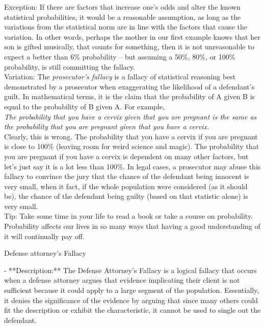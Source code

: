 \documentclass[a4paper,12pt,single,pdftex]{scrbook}
\begin{document}
{    
      Exception: If there are factors that increase one’s odds and alter the known statistical probabilities, it would be a reasonable assumption, as long as the variations from the statistical norm are in line with the factors that cause the variation.  In other words, perhaps the mother in our first example knows that her son is gifted musically, that counts for something, then it is not unreasonable to expect a better than 6\% probability -- but assuming a 50\%, 80\%, or 100\% probability, is still committing the fallacy.
    \\

    
      Variation: The {\em prosecutor's fallacy} is a fallacy of statistical reasoning best demonstrated by a prosecutor when exaggerating the likelihood of a defendant's guilt. In mathematical terms, it is the claim that the probability of A given B is equal to the probability of B given A. For example,
    \\

    
      {\em The probability that you have a cervix given that you are pregnant is the same as the probability that you are pregnant given that you have a cervix.}
    \\

    
      Clearly, this is wrong. The probability that you have a cervix if you are pregnant is close to 100\% (leaving room for weird science and magic). The probability that you are pregnant if you have a cervix is dependent on many other factors, but let’s just say it is a lot less than 100\%. In legal cases, a prosecutor may abuse this fallacy to convince the jury that the chance of the defendant being innocent is very small, when it fact, if the whole population were considered (as it should be), the chance of the defendant being guilty (based on that statistic alone) is very small.
    \\

    
      Tip: Take some time in your life to read a book or take a course on probability.  Probability affects our lives in so many ways that having a good understanding of it will continually pay off.
    \\

  }


Defense attorney's Fallacy
    
      - **Description:** The Defense Attorney's Fallacy is a logical fallacy that occurs when a defense attorney argues that evidence implicating their client is not sufficient because it could apply to a large segment of the population. Essentially, it denies the significance of the evidence by arguing that since many others could fit the description or exhibit the characteristic, it cannot be used to single out the defendant.
    \\
\end{document}
